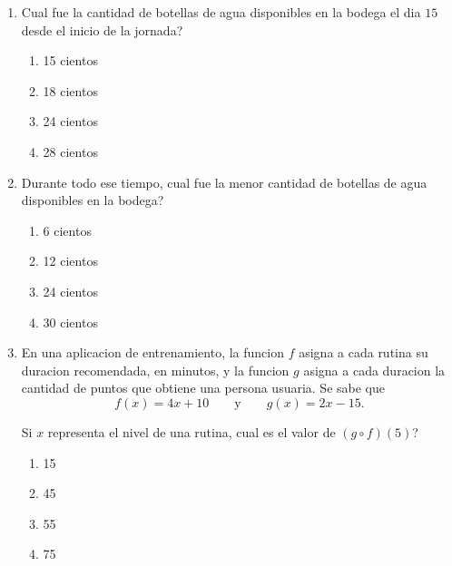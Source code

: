 \documentclass[12pt]{article}
\begin{document}
\begin{enumerate}[label=\textbf{\arabic*.}, itemsep=1.05cm]
\begin{center}
\end{center}

\item
\textquestiondown Cual fue la cantidad de botellas de agua disponibles en la bodega el dia $15$ desde el inicio de la jornada?

\begin{enumerate}[label=\Alph*)]
  \item 15 cientos
  \item 18 cientos
  \item 24 cientos
  \item 28 cientos
\end{enumerate}

\item
Durante todo ese tiempo, \textquestiondown cual fue la menor cantidad de botellas de agua disponibles en la bodega?

\begin{enumerate}[label=\Alph*)]
  \item 6 cientos
  \item 12 cientos
  \item 24 cientos
  \item 30 cientos
\end{enumerate}

\Needspace{0.62\textheight}
\item
En una aplicacion de entrenamiento, la funcion $f$ asigna a cada rutina su duracion recomendada, en minutos, y la funcion $g$ asigna a cada duracion la cantidad de puntos que obtiene una persona usuaria. Se sabe que
\[
f(x)=4x+10 \qquad \text{y} \qquad g(x)=2x-15.
\]

Si $x$ representa el nivel de una rutina, \textquestiondown cual es el valor de $(g\circ f)(5)$?

\begin{enumerate}[label=\Alph*)]
  \item 15
  \item 45
  \item 55
  \item 75
\end{enumerate}

\end{enumerate}
\end{document}
